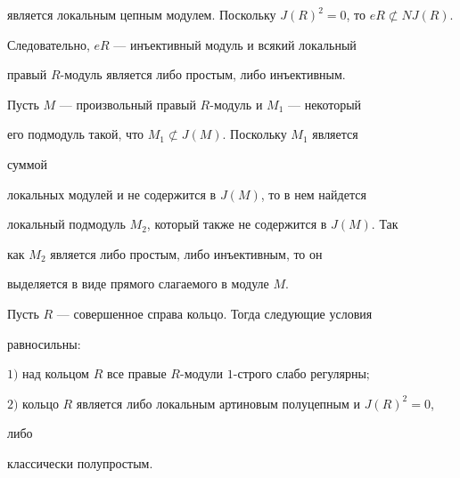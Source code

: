 \begin{pf}
является локальным цепным модулем. Поскольку $J(R)^2=0$, то $eR\not\subset 


NJ(R)$. 


Следовательно, $eR$ --- инъективный модуль и всякий локальный 


правый $R$-модуль является либо простым, либо инъективным. 


Пусть $M$ --- произвольный правый $R$-модуль и $M_1$ --- некоторый 


его подмодуль такой, что $M_1\not\subset J(M)$. Поскольку $M_1$ является 


суммой 


локальных модулей и не содержится в $J(M)$, то в нем найдется 


локальный подмодуль $M_2$, который также не содержится в $J(M)$. Так 


как $M_2$ является либо простым, либо инъективным, то он 


выделяется в виде прямого слагаемого в модуле $M$. 


\end{pf} 


 


\begin{thm} 


Пусть $R$ --- совершенное справа кольцо. Тогда следующие условия 


равносильны\/${:}$ 


 


$1)$ над кольцом $R$ все правые $R$-модули $1$-строго слабо регулярны$;$ 


 


$2)$ кольцо $R$ является либо локальным артиновым полуцепным и $J(R)^2=0$, 


либо 


классически полупростым. 


\end{thm} 


 


